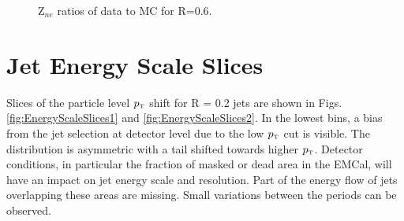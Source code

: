 \documentclass[ALICE]{ALICE_analysis_notes}
\newcommand{\pT}{$p_{\mbox{\tiny T}}$\xspace}
\begin{document}
\begin{appendix}
\begin{figure}[h!]
    \qquad
    \caption{Z$_{ne}$ ratios of data to MC for R=0.6.}
    \label{fig:TriggerBiasRatiosZneR06}
\end{figure}

\newpage

\section{Jet Energy Scale Slices}
\label{sec:AppendixJES}

Slices of the particle level \pT shift for R = 0.2 jets are shown in Figs. \ref{fig:EnergyScaleSlices1} and \ref{fig:EnergyScaleSlices2}. In the lowest bins, a bias from the jet selection at detector level due to the low \pT cut is visible. The distribution is asymmetric with a tail shifted towards higher \pT. Detector conditions, in particular the fraction of masked or dead area in the EMCal, will have an impact on jet energy scale and resolution. Part of the energy flow of jets overlapping these areas are missing. Small variations between the periods can be observed.

\newpage


\end{appendix}
\end{document}
